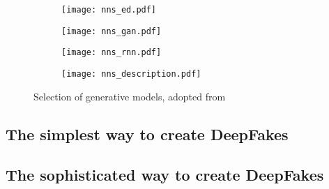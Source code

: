 \begin{figure}[htp]
    \captionsetup[subfigure]{justification=centering}
    \centering
    \begin{minipage}[s][3.3cm]{.23\columnwidth}
        \begin{subfigure}{\columnwidth}
            \texttt{[image: nns\_ed.pdf]}
            \caption{}\label{subfig:ed}
        \end{subfigure}
        \vfil
        \begin{subfigure}{\columnwidth}
            \texttt{[image: nns\_gan.pdf]}
            \caption{}\label{subfig:gan}
        \end{subfigure}
    \end{minipage}
    \begin{subfigure}{.2\columnwidth}
        \texttt{[image: nns\_rnn.pdf]}
        \caption{}\label{subfig:rnn}
    \end{subfigure}
    \begin{minipage}[s][3.7cm]{.17\columnwidth}
        \begin{subfigure}{\columnwidth}
            \texttt{[image: nns\_description.pdf]}
        \end{subfigure}\vfil
    \end{minipage}
    \caption{Selection of generative models, adopted from~\cite{Mirsky.2020}}\label{fig:generative-models}
\end{figure}
\subsection{The simplest way to create DeepFakes}
\blindtext[4]
\subsection{The sophisticated way to create DeepFakes}
\blindtext[4]